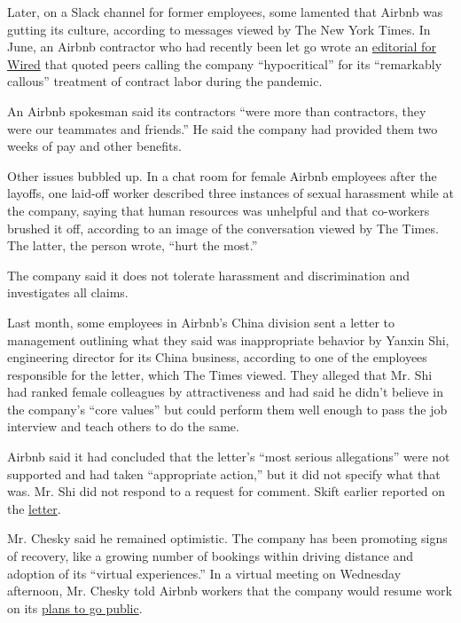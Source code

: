 Later, on a Slack channel for former employees, some lamented that
Airbnb was gutting its culture, according to messages viewed by The New
York Times. In June, an Airbnb contractor who had recently been let go
wrote an
\href{https://www.wired.com/story/airbnb-quietly-fired-hundreds-of-contract-workers-im-one-of-them/}{editorial
for Wired} that quoted peers calling the company ``hypocritical'' for
its ``remarkably callous'' treatment of contract labor during the
pandemic.

An Airbnb spokesman said its contractors ``were more than contractors,
they were our teammates and friends.'' He said the company had provided
them two weeks of pay and other benefits.

Other issues bubbled up. In a chat room for female Airbnb employees
after the layoffs, one laid-off worker described three instances of
sexual harassment while at the company, saying that human resources was
unhelpful and that co-workers brushed it off, according to an image of
the conversation viewed by The Times. The latter, the person wrote,
``hurt the most.''

The company said it does not tolerate harassment and discrimination and
investigates all claims.

Last month, some employees in Airbnb's China division sent a letter to
management outlining what they said was inappropriate behavior by Yanxin
Shi, engineering director for its China business, according to one of
the employees responsible for the letter, which The Times viewed. They
alleged that Mr. Shi had ranked female colleagues by attractiveness and
had said he didn't believe in the company's ``core values'' but could
perform them well enough to pass the job interview and teach others to
do the same.

Airbnb said it had concluded that the letter's ``most serious
allegations'' were not supported and had taken ``appropriate action,''
but it did not specify what that was. Mr. Shi did not respond to a
request for comment. Skift earlier reported on the
\href{https://skift.com/2020/06/12/airbnb-investigates-allegations-of-sexual-harassment-against-a-top-chinese-exec/}{letter}.

Mr. Chesky said he remained optimistic. The company has been promoting
signs of recovery, like a growing number of bookings within driving
distance and adoption of its ``virtual experiences.'' In a virtual
meeting on Wednesday afternoon, Mr. Chesky told Airbnb workers that the
company would resume work on its
\href{https://www.nytimes.com/2020/07/15/technology/airbnb-ipo.html}{plans
to go public}.

